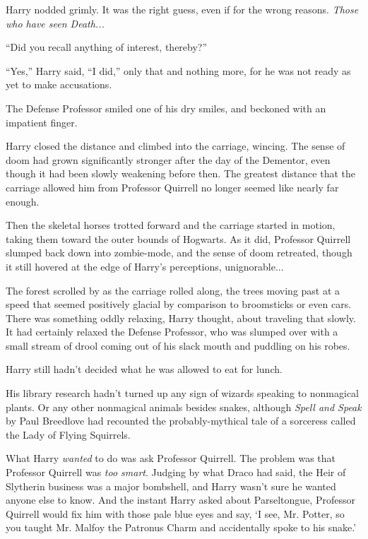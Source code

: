 Harry nodded grimly. It was the right guess, even if for the wrong reasons. \emph{Those who have seen Death...}

``Did you recall anything of interest, thereby?''

``Yes,'' Harry said, ``I did,'' only that and nothing more, for he was not ready as yet to make accusations.

The Defense Professor smiled one of his dry smiles, and beckoned with an impatient finger.

Harry closed the distance and climbed into the carriage, wincing. The sense of doom had grown significantly stronger after the day of the Dementor, even though it had been slowly weakening before then. The greatest distance that the carriage allowed him from Professor Quirrell no longer seemed like nearly far enough.

Then the skeletal horses trotted forward and the carriage started in motion, taking them toward the outer bounds of Hogwarts. As it did, Professor Quirrell slumped back down into zombie-mode, and the sense of doom retreated, though it still hovered at the edge of Harry's perceptions, unignorable...

The forest scrolled by as the carriage rolled along, the trees moving past at a speed that seemed positively glacial by comparison to broomsticks or even cars. There was something oddly relaxing, Harry thought, about traveling that slowly. It had certainly relaxed the Defense Professor, who was slumped over with a small stream of drool coming out of his slack mouth and puddling on his robes.

Harry still hadn't decided what he was allowed to eat for lunch.

His library research hadn't turned up any sign of wizards speaking to nonmagical plants. Or any other nonmagical animals besides snakes, although \emph{Spell and Speak} by Paul Breedlove had recounted the probably-mythical tale of a sorceress called the Lady of Flying Squirrels.

What Harry \emph{wanted} to do was ask Professor Quirrell. The problem was that Professor Quirrell was \emph{too smart}. Judging by what Draco had said, the Heir of Slytherin business was a major bombshell, and Harry wasn't sure he wanted anyone else to know. And the instant Harry asked about Parseltongue, Professor Quirrell would fix him with those pale blue eyes and say, `I see, Mr. Potter, so you taught Mr. Malfoy the Patronus Charm and accidentally spoke to his snake.'

